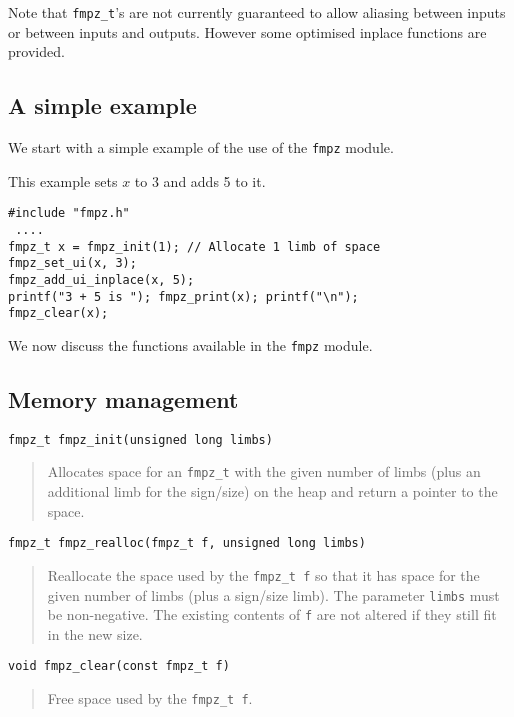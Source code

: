 \documentclass[a4paper,10pt]{article}
\newcommand{\code}{\lstinline}
\begin{document}
Note that \code{fmpz_t}'s are not currently guaranteed to allow aliasing between inputs or between inputs and outputs. However some optimised inplace functions are provided.

\subsection{A simple example}
We start with a simple example of the use of the \code{fmpz} module.

This example sets $x$ to 3 and adds 5 to it.

\begin{lstlisting}
#include "fmpz.h"
 ....
fmpz_t x = fmpz_init(1); // Allocate 1 limb of space
fmpz_set_ui(x, 3);
fmpz_add_ui_inplace(x, 5);
printf("3 + 5 is "); fmpz_print(x); printf("\n");
fmpz_clear(x);
\end{lstlisting}

We now discuss the functions available in the \code{fmpz} module.

\subsection{Memory management}

\begin{lstlisting}
fmpz_t fmpz_init(unsigned long limbs) 
\end{lstlisting}
\begin{quote}
Allocates space for an \code{fmpz_t} with the given number of limbs (plus an additional limb for the sign/size) on the heap and return a pointer to the space.
\end{quote}

\begin{lstlisting}
fmpz_t fmpz_realloc(fmpz_t f, unsigned long limbs)
\end{lstlisting}
\begin{quote}
Reallocate the space used by the \code{fmpz_t f} so that it has space for the given number of limbs (plus a sign/size limb). The parameter \code{limbs} must be non-negative. The existing contents of \code{f} are not altered if they still fit in the new size.
\end{quote}

\begin{lstlisting}
void fmpz_clear(const fmpz_t f)
\end{lstlisting}
\begin{quote}
Free space used by the \code{fmpz_t f}.
\end{quote}
\end{document}
